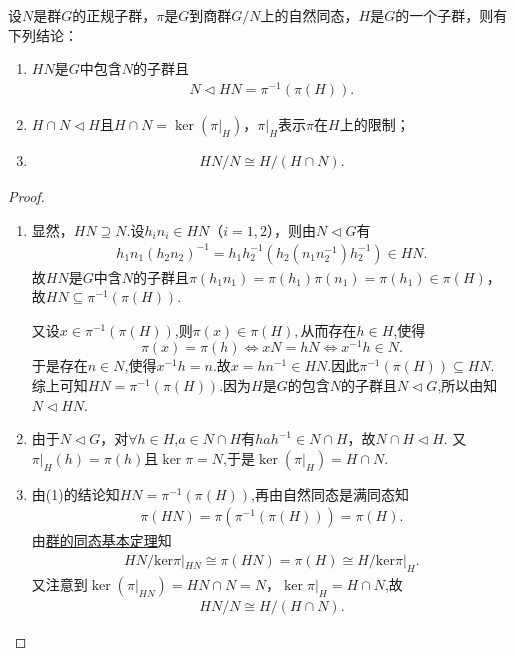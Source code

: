 \documentclass[../../main.tex]{subfiles}%
\begin{document}
\begin{theorem}\label{theorem:抽象代数--定理1.7.3}
设$N$是群$G$的正规子群，$\pi$是$G$到商群$G/N$上的自然同态，$H$是$G$的一个子群，则有下列结论：
\begin{enumerate}[(1)]
\item\label{theorem:抽象代数--定理1.7.3-1} $HN$是$G$中包含$N$的子群且
\begin{align}
N\lhd HN = \pi^{-1}(\pi(H)). \label{eq:::fi0ejw89f38j843g2fw2f4}
\end{align}

\item\label{theorem:抽象代数--定理1.7.3-2} $H \cap N \lhd H$且$H \cap N = \ker(\pi|_H)$，$\pi|_H$表示$\pi$在$H$上的限制；

\item\label{theorem:抽象代数--定理1.7.3-3}
\begin{align*}
HN/N \cong H/(H \cap N ).
\end{align*}
\end{enumerate}
\end{theorem}
\begin{remark}

\end{remark}
\begin{proof}
\begin{enumerate}[(1)]
\item 显然，$HN \supseteq N$.设$h_in_i \in HN$（$i=1,2$），则由$N\lhd G$有
\begin{align*}
h_1n_1(h_2n_2)^{-1} = h_1h_2^{-1}(h_2(n_1n_2^{-1})h_2^{-1}) \in HN.
\end{align*}
故$HN$是$G$中含$N$的子群且$\pi(h_1n_1) = \pi(h_1)\pi(n_1) = \pi(h_1)\in \pi(H)$，故$HN \subseteq \pi^{-1}(\pi(H))$. 

又设$x\in \pi^{-1}(\pi(H))$,则$\pi(x)\in \pi(H),$从而存在$h\in H$,使得
$$
\pi(x)=\pi(h)\iff xN=hN\iff x^{-1}h\in N.
$$
于是存在$n\in N$,使得$x^{-1}h=n$.故$x=hn^{-1}\in HN.$因此$\pi^{-1}(\pi(H))\subseteq HN.$
综上可知$HN = \pi^{-1}(\pi(H))$.因为$H$是$G$的包含$N$的子群且$N\lhd G$,所以由知$N\lhd HN$.

\item 由于$N \lhd G$，对$\forall h \in H$,$a \in N \cap H$有$hah^{-1} \in N \cap H$，故$N \cap H \lhd H$. 又$\pi|_H(h) = \pi(h)$且$\ker \pi=N$,于是$\ker(\pi|_H) = H \cap N$.

\item 由(1)的结论知$HN=\pi^{-1}(\pi(H))$,再由自然同态是满同态知
\begin{align*}
\pi(HN) = \pi(\pi^{-1}(\pi(H)))=\pi(H).
\end{align*}
由\hyperref[theorem:群的同态基本定理]{群的同态基本定理}知
\begin{align*}
HN/\mathrm{ker}\pi |_{HN}\cong \pi (HN)=\pi \left( H \right) \cong H/\mathrm{ker}\pi |_H.
\end{align*}
又注意到$\ker(\pi|_{HN}) = HN \cap N = N$，$\ker \pi|_{H}=H\cap N$,故
\begin{align*}
HN/N \cong H/(H \cap N ).
\end{align*}
\end{enumerate}
\end{proof}
\end{document}

